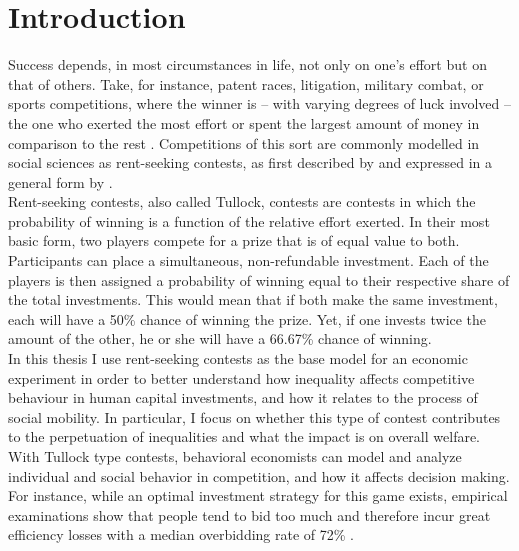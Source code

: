 \chapter{Introduction}
\thispagestyle{fancy}
\label{ch:intro}


Success depends, in most circumstances in life, not only on one's effort but on that of others. Take, for instance, patent races, litigation, military combat, or sports competitions, where the winner is -- with varying degrees of luck involved -- the one who exerted the most effort or spent the largest amount of money in comparison to the rest \citep{konrad2009}. Competitions of this sort are commonly modelled in social sciences as rent-seeking contests, as first described by \cite{tullock1980}  and expressed in a general form by \cite{sheremeta2010a}. \\

Rent-seeking contests, also called Tullock, contests are contests in which the probability of winning is a function of the relative effort exerted. In their most basic form, two players compete for a prize that is of equal value to both. Participants can place a simultaneous, non-refundable investment. Each of the players is then assigned a probability of winning equal to their respective share of the total investments. This would mean that if both make the same investment, each will have a 50\% chance of winning the prize. Yet, if one invests twice the amount of the other, he or she will have a 66.67\% chance of winning.\\ 

In this thesis I use rent-seeking contests as the base model for an economic experiment in order to better understand how inequality affects competitive behaviour in human capital investments, and how it relates to the process of social mobility. In particular, I focus on whether this type of contest contributes to the perpetuation of inequalities and what the impact is on overall welfare.\\

With Tullock type contests, behavioral economists can model and analyze individual and social behavior in competition, and how it affects decision making. For instance, while an optimal investment strategy for this game exists, empirical examinations show that people tend to bid too much and therefore incur great efficiency losses with a median overbidding rate of 72\% \citep{sheremeta2013, chowdhury2014, konrad2009, dechenaux2015}.\\


